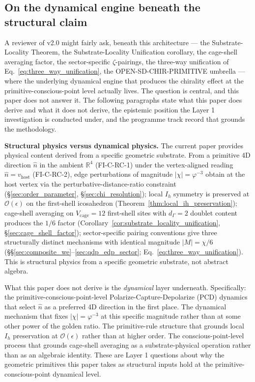 \documentclass[11pt,letterpaper]{article}
\newcommand{\phig}{\varphi}
\begin{document}
\subsection{On the dynamical engine beneath the structural claim}\label{sec:dynamical_engine}

A reviewer of v2.0 might fairly ask, beneath this architecture --- the Substrate-Locality Theorem, the Substrate-Locality Unification corollary, the cage-shell averaging factor, the sector-specific $\zeta$-pairings, the three-way unification of Eq.~\eqref{eq:three_way_unification}, the OPEN-SD-CHIR-PRIMITIVE umbrella --- where the underlying dynamical engine that produces the chirality effect at the primitive-conscious-point level actually lives. The question is central, and this paper does not answer it. The following paragraphs state what this paper does derive and what it does not derive, the epistemic position the Layer 1 investigation is conducted under, and the programme track record that grounds the methodology.

\textbf{Structural physics versus dynamical physics.} The current paper provides physical content derived from a specific geometric substrate. From a primitive 4D direction $\hat{n}$ in the ambient $\mathbb{R}^4$ (FI-C-RC-1) under the vertex-aligned reading $\hat{n} = v_{\text{host}}$ (FI-C-RC-2), edge perturbations of magnitude $|\chi| = \phig^{-3}$ obtain at the host vertex via the perturbative-distance-ratio constraint (\S\ref{sec:order_parameter}, \S\ref{sec:chi_resolution}); local $I_h$ symmetry is preserved at $\mathcal{O}(\epsilon)$ on the first-shell icosahedron (Theorem~\ref{thm:local_ih_preservation}); cage-shell averaging on $V_{\text{cage}} = 12$ first-shell sites with $d_\Gamma = 2$ doublet content produces the $1/6$ factor (Corollary~\ref{cor:substrate_locality_unification}, \S\ref{sec:cage_shell_factor}); sector-specific pairing conventions give three structurally distinct mechanisms with identical magnitude $|M| = \chi/6$ (\S\S\ref{sec:composite_we}--\ref{sec:qdp_edp_sector}; Eq.~\eqref{eq:three_way_unification}). This is structural physics from a specific geometric substrate, not abstract algebra.

What this paper does not derive is the \emph{dynamical} layer underneath. Specifically: the primitive-conscious-point-level Polarize-Capture-Depolarize (PCD) dynamics that select $\hat{n}$ as a preferred 4D direction in the first place. The dynamical mechanism that fixes $|\chi| = \phig^{-3}$ at this specific magnitude rather than at some other power of the golden ratio. The primitive-rule structure that grounds local $I_h$ preservation at $\mathcal{O}(\epsilon)$ rather than at higher order. The conscious-point-level process that grounds cage-shell averaging as a substrate-physical operation rather than as an algebraic identity. These are Layer 1 questions about why the geometric primitives this paper takes as structural inputs hold at the primitive-conscious-point dynamical level.
\end{document}
